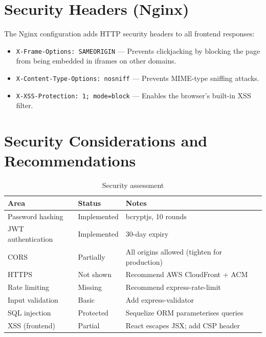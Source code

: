 \documentclass[12pt,a4paper]{report}
\begin{document}
\section{Security Headers (Nginx)}

The Nginx configuration adds HTTP security headers to all frontend responses:

\begin{itemize}[leftmargin=2em]
  \item \texttt{X-Frame-Options: SAMEORIGIN} --- Prevents clickjacking by blocking the page from being embedded in iframes on other domains.
  \item \texttt{X-Content-Type-Options: nosniff} --- Prevents MIME-type sniffing attacks.
  \item \texttt{X-XSS-Protection: 1; mode=block} --- Enables the browser's built-in XSS filter.
\end{itemize}

\section{Security Considerations and Recommendations}

\begin{table}[H]
  \centering
  \caption{Security assessment}
  \begin{tabular}{lll}
    \toprule
    \textbf{Area} & \textbf{Status} & \textbf{Notes} \\
    \midrule
    Password hashing    & Implemented & bcryptjs, 10 rounds \\
    JWT authentication  & Implemented & 30-day expiry \\
    CORS               & Partially   & All origins allowed (tighten for production) \\
    HTTPS              & Not shown   & Recommend AWS CloudFront + ACM \\
    Rate limiting       & Missing     & Recommend express-rate-limit \\
    Input validation    & Basic       & Add express-validator \\
    SQL injection       & Protected   & Sequelize ORM parameterises queries \\
    XSS (frontend)      & Partial     & React escapes JSX; add CSP header \\
    \bottomrule
  \end{tabular}
\end{table}

\end{document}
